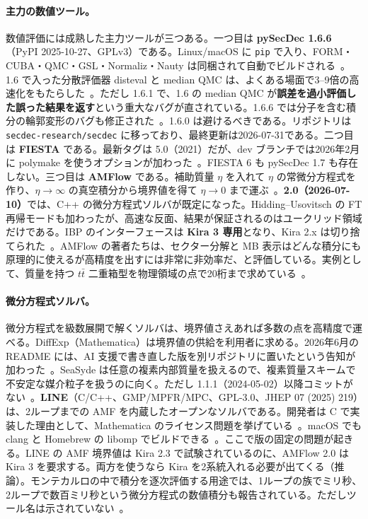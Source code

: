 \documentclass[a4paper,10pt]{ltjsarticle}
\begin{document}
\paragraph{主力の数値ツール。}数値評価には成熟した主力ツールが三つある。一つ目は \textbf{pySecDec 1.6.6}（PyPI 2025-10-27、GPLv3）である。Linux/macOS に \texttt{pip} で入り、FORM・CUBA・QMC・GSL・Normaliz・Nauty は同梱されて自動でビルドされる~\cite{r89,r90}。1.6 で入った分散評価器 disteval と median QMC は、よくある場面で3--9倍の高速化をもたらした~\cite{r91}。ただし 1.6.1 で、1.6 の median QMC が\textbf{誤差を過小評価した誤った結果を返す}という重大なバグが直されている。1.6.6 では分子を含む積分の輪郭変形のバグも修正された~\cite{r92}。1.6.0 は避けるべきである。リポジトリは \texttt{secdec-research/secdec} に移っており、最終更新は2026-07-31である。二つ目は \textbf{FIESTA} である。最新タグは 5.0（2021）だが、dev ブランチでは2026年2月に polymake を使うオプションが加わった~\cite{r93}。FIESTA 6 も pySecDec 1.7 も存在しない。三つ目は \textbf{AMFlow} である。補助質量 $\eta$ を入れて $\eta$ の常微分方程式を作り、$\eta\to\infty$ の真空積分から境界値を得て $\eta\to 0$ まで運ぶ~\cite{r94}。\textbf{2.0（2026-07-10）}では、C++ の微分方程式ソルバが既定になった。Hidding--Usovitsch の FT 再帰モードも加わったが、高速な反面、結果が保証されるのはユークリッド領域だけである。IBP のインターフェースは \textbf{Kira 3 専用}となり、Kira 2.x は切り捨てられた~\cite{r95,r96}。AMFlow の著者たちは、セクター分解と MB 表示はどんな積分にも原理的に使えるが高精度を出すには非常に非効率だ、と評価している。実例として、質量を持つ $t\bar t$ 二重箱型を物理領域の点で20桁まで求めている~\cite{r94}。

\paragraph{微分方程式ソルバ。}微分方程式を級数展開で解くソルバは、境界値さえあれば多数の点を高精度で運べる。DiffExp（Mathematica）は境界値の供給を利用者に求める。2026年6月の README には、AI 支援で書き直した版を別リポジトリに置いたという告知が加わった~\cite{r97}。SeaSyde は任意の複素内部質量を扱えるので、複素質量スキームで不安定な媒介粒子を扱うのに向く。ただし 1.1.1（2024-05-02）以降コミットがない~\cite{r98}。\textbf{LINE}（C/C++、GMP/MPFR/MPC、GPL-3.0、JHEP 07 (2025) 219）は、2ループまでの AMF を内蔵したオープンなソルバである。開発者は C で実装した理由として、Mathematica のライセンス問題を挙げている~\cite{r99,r100}。macOS でも clang と Homebrew の libomp でビルドできる~\cite{r101}。ここで版の固定の問題が起きる。LINE の AMF 境界値は Kira 2.3 で試験されているのに、AMFlow 2.0 は Kira 3 を要求する。両方を使うなら Kira を2系統入れる必要が出てくる（推論）。モンテカルロの中で積分を逐次評価する用途では、1ループの族でミリ秒、2ループで数百ミリ秒という微分方程式の数値積分も報告されている。ただしツール名は示されていない~\cite{r102}。
\end{document}
